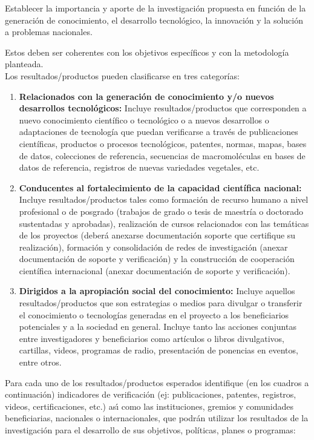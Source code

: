 \begin{instrucciones}
  Establecer la importancia y aporte de la investigación
propuesta en función de la generación de conocimiento, el desarrollo tecnológico, la innovación y
la solución a problemas nacionales.
\end{instrucciones}


\begin{instrucciones}
  Estos deben ser coherentes con los objetivos específicos y con la
  metodología planteada.\\
  Los resultados/productos pueden clasificarse en tres categorías:
  \begin{enumerate}
  \item \textbf{Relacionados con la generación de conocimiento y/o nuevos desarrollos
 tecnológicos:} Incluye resultados/productos que corresponden a nuevo
 conocimiento científico o tecnológico o a nuevos desarrollos o adaptaciones de
 tecnología que puedan verificarse a través de publicaciones científicas,
 productos o procesos tecnológicos, patentes, normas, mapas, bases de datos,
 colecciones de referencia, secuencias de macromoléculas en bases de datos de
 referencia, registros de nuevas variedades vegetales, etc.
\item \textbf{Conducentes al fortalecimiento de la capacidad científica
  nacional:} Incluye resultados/productos tales como formación de
  recurso humano a nivel profesional o de posgrado (trabajos de grado
  o tesis de maestría o doctorado sustentadas y aprobadas),
  realización de cursos relacionados con las temáticas de los
  proyectos (deberá anexarse documentación soporte que certifique su
  realización), formación y consolidación de redes de investigación
  (anexar documentación de soporte y verificación) y la construcción
  de cooperación científica internacional (anexar documentación de
  soporte y verificación).
\item \textbf{Dirigidos a la apropiación social del conocimiento:}
  Incluye aquellos resultados/productos que son estrategias o medios
  para divulgar o transferir el conocimiento o tecnologías generadas
  en el proyecto a los beneficiarios potenciales y a la sociedad en
  general. Incluye tanto las acciones conjuntas entre investigadores y
  beneficiarios como artículos o libros divulgativos, cartillas,
  videos, programas de radio, presentación de ponencias en eventos,
  entre otros.
  \end{enumerate}

  Para cada uno de los resultados/productos esperados identifique (en
  los cuadros a continuación) indicadores de verificación (ej:
  publicaciones, patentes, registros, videos, certificaciones, etc.)
  as\'\i{} como las instituciones, gremios y comunidades beneficiarias,
  nacionales o internacionales, que podrán utilizar los resultados de
  la investigación para el desarrollo de sus objetivos, políticas,
  planes o programas:

\end{instrucciones}

